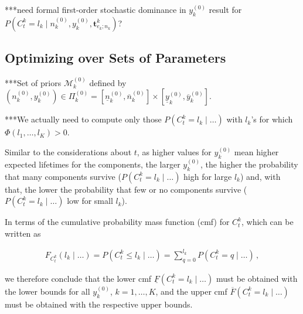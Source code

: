 \documentclass[Journal,SectionNumbers,SingleSpace,InsideFigs]{ascelike}
\newcommand{\mbf}[1]{\mathbf{#1}}
\renewcommand{\vec}[1]{{\bm#1}}
\newcommand{\uz}{^{(0)}} %
\newcommand{\un}{^{(n)}} %
\newcommand{\ul}[1]{\underline{#1}}
\newcommand{\ol}[1]{\overline{#1}}
\def\ykz{y\uz_k}
\def\ykzl{\ul{y}\uz_k}
\def\ykzu{\ol{y}\uz_k}
\def\nkz{n\uz_k}
\def\nkn{n\un_k}
\def\nkzl{\ul{n}\uz_k}
\def\nkzu{\ol{n}\uz_k}
\def\MkZ{\mathcal{M}\uz_k}
\def\PkZ{\Pi\uz_k}
\begin{document}

***need formal first-order stochastic dominance in $\ykz$ result for $P(C^k_t = l_k\mid\nkz,\ykz, \vec{t}^k_{e_k;n_k})$?

\subsection{Optimizing over Sets of Parameters}
\label{sec:optimize}

***Set of priors $\MkZ$ defined by $(\nkz,\ykz) \in \PkZ = [\nkzl,\nkzu] \times [\ykzl,\ykzu]$.

***We actually need to compute only those $P(C^k_t = l_k\mid \ldots)$ with $l_k$'s for which $\Phi(l_1,\ldots,l_K) > 0$.


Similar to the considerations about $t$, as higher values for $\ykz$ mean higher expected lifetimes for the components,
the larger $\ykz$, the higher the probability that many components survive
($P(C^k_t = l_k\mid\ldots)$ high for large $l_k$)
and, with that, the lower the probability that few or no components survive
($P(C^k_t = l_k\mid\ldots)$ low for small $l_k$).

In terms of the cumulative probability mass function (cmf) for $C^k_t$, which can be written as 
\begin{linenomath*}
\begin{align}
F_{C^k_t}(l_k \mid \ldots) = P(C^k_t \leq l_k\mid\ldots) = \sum_{q=0}^{l_k} P(C^k_t = q\mid\ldots)\,,
\end{align}
\end{linenomath*}
we therefore conclude that
the lower cmf $\ul{F}(C^k_t = l_k\mid \ldots)$ must be obtained with the lower bounds for all $\ykz$, $k=1,\ldots,K$,
and the upper cmf $\ol{F}(C^k_t = l_k\mid \ldots)$ must be obtained with the respective upper bounds.
\end{document}
